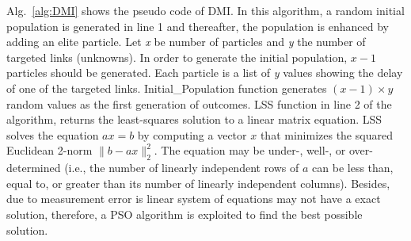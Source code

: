 \documentclass[10pt, journal, letterpaper]{IEEEtran}
\begin{document}
Alg.~\ref{alg:DMI} shows the pseudo code of DMI. In this algorithm, a random initial population is generated in line 1 and thereafter, the population is enhanced by adding an elite particle. Let \textit{x} be number of particles and \textit{y} the number of targeted links (unknowns). In order to generate the initial population, $x-1$ particles should be generated. Each particle is a list of \textit{y} values showing the delay of one of the targeted links. Initial\_Population function generates $(x-1)\times y$ random values as the first generation of outcomes. LSS function in line 2 of the algorithm, returns the least-squares solution to a linear matrix equation. LSS solves the equation $ax = b$ by computing a vector $x$ that minimizes the squared Euclidean 2-norm $\| b - a x \|^2_2$. The equation may be under-, well-, or over-determined (i.e., the number of linearly independent rows of $a$ can be less than, equal to, or greater than its number of linearly independent columns)\cite{lstsq}. Besides, due to measurement error is linear system of equations may not have a exact solution, therefore, a PSO algorithm is exploited to find the best possible solution.
\end{document}
